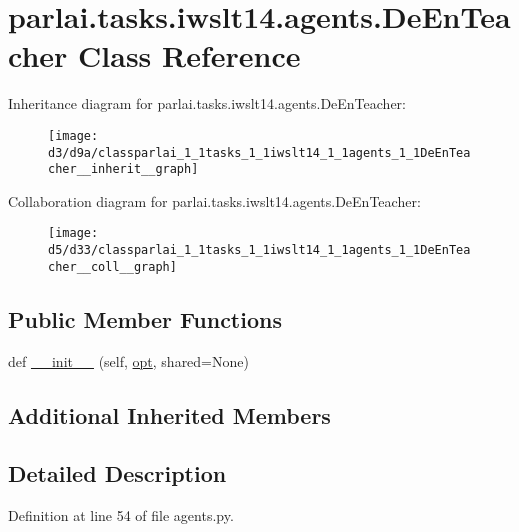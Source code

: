 \hypertarget{classparlai_1_1tasks_1_1iwslt14_1_1agents_1_1DeEnTeacher}{}\section{parlai.\+tasks.\+iwslt14.\+agents.\+De\+En\+Teacher Class Reference}
\label{classparlai_1_1tasks_1_1iwslt14_1_1agents_1_1DeEnTeacher}


Inheritance diagram for parlai.\+tasks.\+iwslt14.\+agents.\+De\+En\+Teacher\+:\nopagebreak
\begin{figure}[H]
\begin{center}
\leavevmode
\texttt{[image: d3/d9a/classparlai\_1\_1tasks\_1\_1iwslt14\_1\_1agents\_1\_1DeEnTeacher\_\_inherit\_\_graph]}
\end{center}
\end{figure}


Collaboration diagram for parlai.\+tasks.\+iwslt14.\+agents.\+De\+En\+Teacher\+:\nopagebreak
\begin{figure}[H]
\begin{center}
\leavevmode
\texttt{[image: d5/d33/classparlai\_1\_1tasks\_1\_1iwslt14\_1\_1agents\_1\_1DeEnTeacher\_\_coll\_\_graph]}
\end{center}
\end{figure}
\subsection*{Public Member Functions}
\begin{DoxyCompactItemize}
\item 
def \hyperlink{classparlai_1_1tasks_1_1iwslt14_1_1agents_1_1DeEnTeacher_a1b0090df254e8af7cc6b0073362a400d}{\+\_\+\+\_\+init\+\_\+\+\_\+} (self, \hyperlink{classparlai_1_1core_1_1agents_1_1Teacher_a3ce6243860ce978a897922863ed32fa4}{opt}, shared=None)
\end{DoxyCompactItemize}
\subsection*{Additional Inherited Members}


\subsection{Detailed Description}


Definition at line 54 of file agents.\+py.



